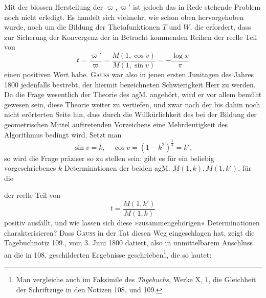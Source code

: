 Mit der blossen Herstellung der \(\varpi,\varpi'\) ist jedoch das in Rede stehende
Problem noch nicht erledigt. Es handelt sich vielmehr, wie schon oben hervorgehoben wurde, noch um die Bildung der Thetafunktionen \(T\) und \(W\), die
erfordert, dass zur Sicherung der Konvergenz der in Betracht kommenden
Reihen der reelle Teil von
\begingroup\makeatletter\tagsleft@true\let\veqno\leqno\makeatother
\begin{equation*}
t=\frac{\varpi'}{\varpi}=\frac{M(1,\cos v)}{M(1,\sin v)}=-\frac{\log x}{\pi}\tag{2}
\end{equation*}
\endgroup
\noindent einen positiven Wert habe. \textsc{Gauss} war also in jenen ersten Junitagen des
Jahres 1800 jedenfalls bestrebt, der hiermit bezeichneten Schwierigkeit Herr
zu werden. Da die Frage wesentlich der Theorie des agM. angehört, wird
er vor allem bemüht gewesen sein, diese Theorie weiter zu vertiefen, und zwar
nach der bis dahin noch nicht erörterten Seite hin, dass durch die Willkürlichkeit des bei der Bildung der geometrischen Mittel auftretenden Vorzeichens
eine Mehrdeutigkeit des Algorithmus bedingt wird. Setzt man
\begingroup\makeatletter\tagsleft@true\let\veqno\leqno\makeatother
\begin{equation*}
\sin v=k,\quad \cos v=(1-k^2)^{\frac12}=k',\tag{3}
\end{equation*}
\endgroup
\noindent so wird die Frage präziser so zu stellen sein: gibt es für ein beliebig vorgeschriebenes \(k\) Determinationen der beiden agM. \(M(1,k),M(1,k')\), für die\par
\clearpage{}
\noindent der reelle Teil von
\begingroup\makeatletter\tagsleft@true\let\veqno\leqno\makeatother
\begin{equation*}
t=\frac{M(1,k')}{M(1,k)}\tag{2\,a}
\end{equation*}
\endgroup
\noindent positiv ausfällt, und wie lassen sich diese »zusammengehörigen« Determinationen charakterisieren? Dass \textsc{Gauss} in der Tat diesen Weg eingeschlagen hat,
zeigt die Tagebuchnotiz 109., vom 3. Juni 1800 datiert, also in unmittelbarem
Anschluss an die in 108. geschilderten Ergebnisse geschrieben\footnote{Man vergleiche auch im Faksimile des \textit{Tagebuchs}, Werke X, 1, die Gleichheit der Schriftzüge in den Notizen 108. und 109.}, die so lautet:

